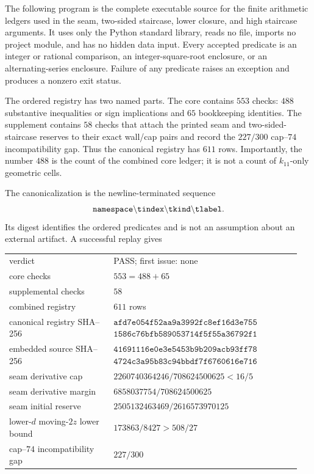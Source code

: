 \documentclass[11pt]{article}
\numberwithin{equation}{section}
\theoremstyle{definition}
\theoremstyle{remark}
\begin{document}
The following program is the complete executable source for the finite
arithmetic ledgers used in the seam, two-sided staircase, lower closure, and
high staircase arguments.  It uses only the Python standard library, reads no
file, imports no project module, and has no hidden data input.  Every accepted
predicate is an integer or rational comparison, an integer-square-root
enclosure, or an alternating-series enclosure.  Failure of any predicate
raises an exception and produces a nonzero exit status.

The ordered registry has two named parts.  The core contains \(553\) checks:
\(488\) substantive inequalities or sign implications and \(65\) bookkeeping
identities.  The supplement contains \(58\) checks that attach the printed
seam and two-sided-staircase reserves to their exact wall/cap pairs and record
the \(227/300\) cap--\(74\) incompatibility gap.  Thus the canonical registry
has \(611\) rows.  Importantly, the number \(488\) is the count of the combined
core ledger; it is not a count of \(k_{11}\)-only geometric cells.

The canonicalization is the newline-terminated sequence
\[
 \mathtt{namespace\string\tindex\string\tkind\string\tlabel}.
\]
Its digest identifies the ordered predicates and is not an assumption about
an external artifact.  A successful replay gives
\begin{center}
\small
\begin{tabular}{@{}
>{\raggedright\arraybackslash}p{0.34\linewidth}
>{\raggedright\arraybackslash}p{0.61\linewidth}@{}}
verdict & PASS; first issue: none\\
core checks & \(553=488+65\)\\
supplemental checks & \(58\)\\
combined registry & \(611\) rows\\
canonical registry SHA--256 &
\(
\mathtt{afd7e054f52aa9a3992fc8ef16d3e755}\)
\(\mathtt{1586c76bfb589053714f5f55a36792f1}
\)\\
embedded source SHA--256 &
\(
\mathtt{41691116e0e3e5453b9b209acb93ff78}\)
\(\mathtt{4724c3a95b83c94bbdf7f6760616e716}
\)\\
seam derivative cap &
\(2260740364246/708624500625<16/5\)\\
seam derivative margin & \(6858037754/708624500625\)\\
seam initial reserve & \(2505132463469/2616573970125\)\\
lower-\(d\) moving-\(2z\) lower bound & \(173863/8427>508/27\)\\
cap--\(74\) incompatibility gap & \(227/300\)
\end{tabular}
\end{center}
\end{document}
